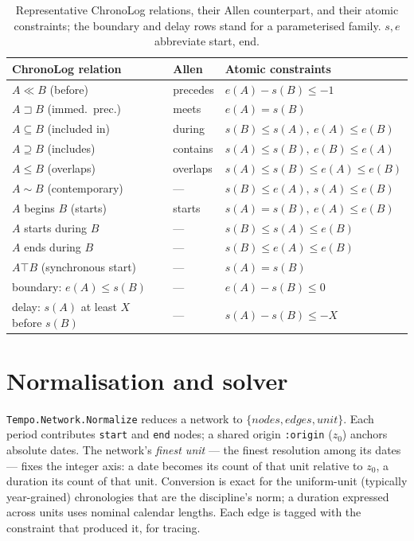 \documentclass[a4paper,USenglish,cleveref,autoref,thm-restate]{oasics-v2021}
\begin{document}
\begin{table}[t]
  \caption{Representative ChronoLog relations, their Allen counterpart,
    and their atomic constraints; the boundary and delay rows stand for
    a parameterised family. $s,e$ abbreviate start, end.}
  \label{tab:map}
  \centering
  \begin{tabular}{lll}
    \toprule
    ChronoLog relation & Allen & Atomic constraints \\
    \midrule
    $A \ll B$ (before)            & precedes   & $e(A) - s(B) \leq -1$ \\
    $A \sqsupset B$ (immed.\ prec.) & meets    & $e(A) = s(B)$ \\
    $A \subseteq B$ (included in) & during     & $s(B) \leq s(A),\ e(A) \leq e(B)$ \\
    $A \supseteq B$ (includes)    & contains   & $s(A) \leq s(B),\ e(B) \leq e(A)$ \\
    $A \leq B$ (overlaps)         & overlaps   & $s(A) \leq s(B) \leq e(A) \leq e(B)$ \\
    $A \sim B$ (contemporary)     & ---        & $s(B) \leq e(A),\ s(A) \leq e(B)$ \\
    $A$ begins $B$ (starts)       & starts     & $s(A) = s(B),\ e(A) \leq e(B)$ \\
    $A$ starts during $B$         & ---        & $s(B) \leq s(A) \leq e(B)$ \\
    $A$ ends during $B$           & ---        & $s(B) \leq e(A) \leq e(B)$ \\
    $A \top B$ (synchronous start) & ---       & $s(A) = s(B)$ \\
    boundary: $e(A) \leq s(B)$    & ---        & $e(A) - s(B) \leq 0$ \\
    delay: $s(A)$ at least $X$ before $s(B)$ & --- & $s(A) - s(B) \leq -X$ \\
    \bottomrule
  \end{tabular}
\end{table}

\section{Normalisation and solver}
\label{sec:solver}

\texttt{Tempo.Network.Normalize} reduces a network to
$\{\textit{nodes}, \textit{edges}, \textit{unit}\}$. Each period
contributes \texttt{start} and \texttt{end} nodes; a shared origin
\texttt{:origin} ($z_0$) anchors absolute dates. The network's
\emph{finest unit} --- the finest resolution among its dates --- fixes
the integer axis: a date becomes its count of that unit relative to
$z_0$, a duration its count of that unit. Conversion is exact for the
uniform-unit (typically year-grained) chronologies that are the
discipline's norm; a duration expressed across units uses nominal
calendar lengths. Each edge is tagged with the constraint that produced
it, for tracing.
\end{document}
